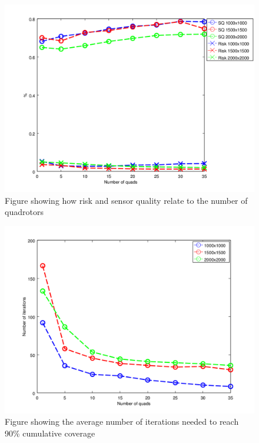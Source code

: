 \documentclass{article}
\begin{document}
\begin{figure}[h!]

    \includegraphics[width=1\columnwidth]{tasefigs/perf_quads_sq_risk.png}

    \caption{Figure showing how risk and sensor quality relate to the number of
    quadrotors}

    \label{fig:nqs_r_sq}

\end{figure}

\begin{figure}[h!]

    \includegraphics[width=1\columnwidth]{tasefigs/perf_quads.png}

    \caption{Figure showing the average number of iterations needed to reach
        90\% cumulative coverage}

    \label{fig:nqs_cum}

\end{figure}
\end{document}
